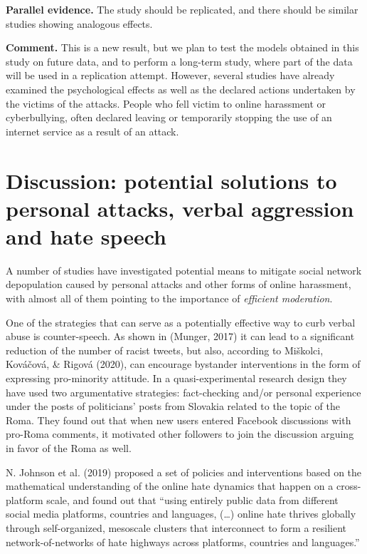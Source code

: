 \documentclass[10pt,dvipsnames]{scrartcl}
\begin{document}
\begin{description}
\item \textbf{Parallel evidence.} The study should be replicated, and there should be similar studies showing analogous effects. 


\textbf{Comment.} This is a new result, but we plan to test the models obtained in this study on future data, and to perform a long-term study, where part of the data will be used in a replication attempt. However, several studies have already examined the psychological effects as well as the declared actions undertaken by the victims of the attacks. People who fell victim to online harassment or cyberbullying, often  declared leaving or temporarily stopping the use of an internet service as a result of an attack. 




\end{description}

\section{Discussion: potential solutions to personal attacks, verbal aggression and hate speech}
\label{discussion}

A number of studies have investigated potential means to mitigate social
network depopulation caused by personal attacks and other forms of
online harassment, with almost all of them pointing to the importance of
\textit{efficient moderation}.

One of the strategies that can serve as a potentially effective way to
curb verbal abuse is counter-speech. As shown in (Munger, 2017) it can
lead to a significant reduction of the number of racist tweets, but
also, according to Miškolci, Kováčová, \& Rigová (2020), can encourage
bystander interventions in the form of expressing pro-minority attitude.
In a quasi-experimental research design they have used two argumentative
strategies: fact-checking and/or personal experience under the posts of
politicians' posts from Slovakia related to the topic of the Roma. They
found out that when new users entered Facebook discussions with pro-Roma
comments, it motivated other followers to join the discussion arguing in
favor of the Roma as well.

N. Johnson et al. (2019) proposed a set of policies and interventions
based on the mathematical understanding of the online hate dynamics that
happen on a cross-platform scale, and found out that ``using entirely
public data from different social media platforms, countries and
languages, (\dots) online hate thrives globally through self-organized,
mesoscale clusters that interconnect to form a resilient
network-of-networks of hate highways across platforms, countries and
languages.''
\end{document}

